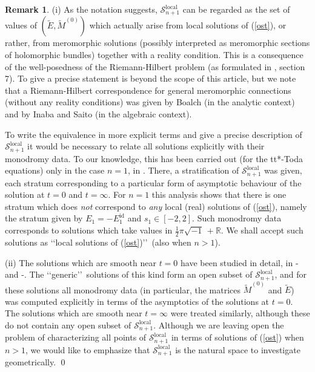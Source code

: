 \documentclass[a4paper,12pt,leqno]{amsart}
\numberwithin{equation}{section}
\theoremstyle{plain}
\theoremstyle{definition}
\newtheorem{remark}[theorem]{Remark}
\newcommand{\R}{\mathbb R}
\DeclareMathOperator{\id}{id}
\newcommand{\cS}{\mathcal{S}}
\renewcommand{\ll}{\lq\lq}
\newcommand{\rr}{\rq\rq\ }
\newcommand{\ii}{ {\scriptstyle\sqrt{-1}}\, }
\newcommand{\tE}{  \tilde E  }
\newcommand{\tMz}{  \tilde M^{(0)}  }
\begin{document}
\begin{remark}\label{remarkX.1}
(i) As the notation suggests, $\cS_{n+1}^{\text{local}}$ can
be regarded as the set of values of $(\tE,\tMz)$
which actually arise from local solutions of (\ref{ost}), or rather, from meromorphic solutions (possibly
interpreted as meromorphic sections of holomorphic bundles) together with a reality condition.
This is a consequence of the
well-posedness of the Riemann-Hilbert problem (as formulated in
\cite{GILX}, section 7).  To give a precise statement is
beyond the scope of this article, but we note that
a Riemann-Hilbert correspondence for general meromorphic connections
(without any reality conditions)
was given by Boalch \cite{Bo01} (in
the analytic context) and by Inaba and Saito \cite{IS13} (in
the algebraic context).

To write the equivalence in more explicit terms
and give a precise description of $\cS_{n+1}^{\text{local}}$
it would be necessary to relate all solutions
explicitly with their monodromy data. To our knowledge, this has been
carried out (for the tt*-Toda equations)
only in the case $n=1$, in \cite{GH17}. There, a stratification
of $\cS_{n+1}^{\text{local}}$ was given, each stratum corresponding
to a particular form of asymptotic behaviour of the solution at $t=0$ and $t=\infty$.
For $n=1$ this analysis shows that there is one stratum which does
{\em not} correspond to {\em any} local (real) solutions of (\ref{ost}),
namely the stratum given by $E_1=- E_1^{\id}$ and $s_1\in [-2,2]$.
Such monodromy data corresponds to solutions which take
values in $\frac12\pi\ii + \R$. We shall accept such solutions as \ll local solutions
of (\ref{ost})\rr (also when $n>1$).

(ii) The
solutions which are smooth near $t=0$ have been studied in detail, in
\cite{GIL1}-\cite{GuLi14} and \cite{GH1}-\cite{GH2}.  The \ll generic\rr solutions
of this kind form an open subset of $\cS_{n+1}^{\text{local}}$,  and for these
solutions all monodromy data (in particular, the matrices $\tMz$ and $\tE$) was computed
explicitly in terms of the asymptotics of the solutions at $t=0$.
The
solutions which are smooth near $t=\infty$ were treated similarly,
although these do not contain any open subset of $\cS_{n+1}^{\text{local}}$.
Although we are leaving open the problem of characterizing all points of $\cS_{n+1}^{\text{local}}$
in terms of solutions of (\ref{ost}) when
$n>1$, we would like to emphasize that $\cS_{n+1}^{\text{local}}$ is the natural space
to investigate geometrically.
\qed
\end{remark}
\end{document}
